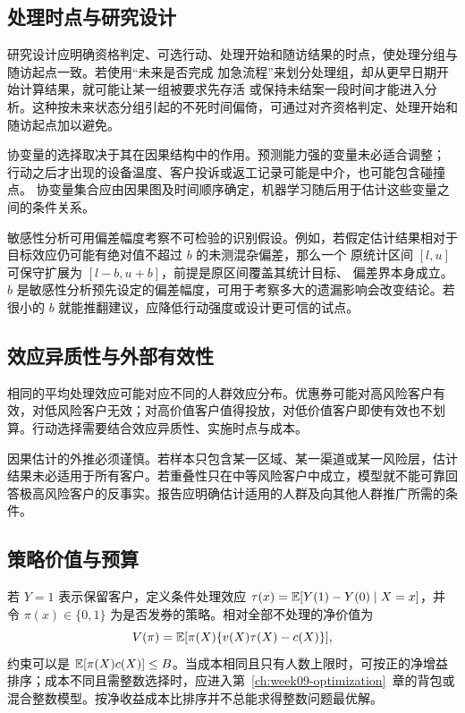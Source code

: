 \subsection{处理时点与研究设计}
研究设计应明确资格判定、可选行动、处理开始和随访结果的时点，使处理分组与随访起点一致。若使用“未来是否完成
加急流程”来划分处理组，却从更早日期开始计算结果，就可能让某一组被要求先存活
或保持未结案一段时间才能进入分析。这种按未来状态分组引起的不死时间偏倚，可通过对齐资格判定、处理开始和随访起点加以避免。

协变量的选择取决于其在因果结构中的作用。预测能力强的变量未必适合调整；
行动之后才出现的设备温度、客户投诉或返工记录可能是中介，也可能包含碰撞点。
协变量集合应由因果图及时间顺序确定，机器学习随后用于估计这些变量之间的条件关系。

敏感性分析可用偏差幅度考察不可检验的识别假设。例如，若假定估计结果相对于
目标效应仍可能有绝对值不超过 \(b\) 的未测混杂偏差，那么一个
原统计区间 \([l,u]\) 可保守扩展为 \([l-b,u+b]\)，前提是原区间覆盖其统计目标、
偏差界本身成立。\(b\) 是敏感性分析预先设定的偏差幅度，可用于考察多大的遗漏影响会改变结论。若很小的 \(b\) 就能推翻建议，应降低行动强度或设计更可信的试点。

\subsection{效应异质性与外部有效性}

相同的平均处理效应可能对应不同的人群效应分布。优惠券可能对高风险客户有效，对低风险客户无效；对高价值客户值得投放，对低价值客户即使有效也不划算。行动选择需要结合效应异质性、实施时点与成本。

因果估计的外推必须谨慎。若样本只包含某一区域、某一渠道或某一风险层，估计结果未必适用于所有客户。若重叠性只在中等风险客户中成立，模型就不能可靠回答极高风险客户的反事实。报告应明确估计适用的人群及向其他人群推广所需的条件。

\subsection{策略价值与预算}
若 \(Y=1\) 表示保留客户，定义条件处理效应 \(\tau(x)=\mathbb E[Y(1)-Y(0)\mid X=x]\)，并令 \(\pi(x)\in\{0,1\}\) 为是否发券的策略。相对全部不处理的净价值为
\[
V(\pi)=\mathbb E[\pi(X)\{v(X)\tau(X)-c(X)\}],
\]
约束可以是 \(\mathbb E[\pi(X)c(X)]\le B\)。当成本相同且只有人数上限时，可按正的净增益排序；成本不同且需整数选择时，应进入第~\ref{ch:week09-optimization}~章的背包或混合整数模型。按净收益成本比排序并不总能求得整数问题最优解。

